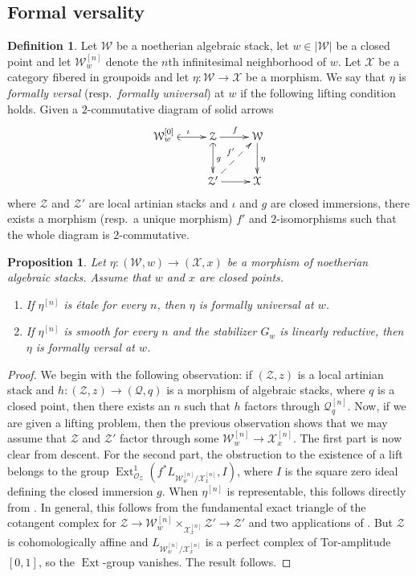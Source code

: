 \documentclass[a4paper]{amsart}
\theoremstyle{plain}
\newtheorem{proposition}[theorem]{Proposition}
\theoremstyle{definition}
\newtheorem{definition}[theorem]{Definition}
\theoremstyle{remark}
\numberwithin{equation}{section}
\newcommand{\stX}{\mathcal{X}} %
\newcommand{\stZ}{\mathcal{Z}} %
\newcommand{\stW}{\mathcal{W}} %
\newcommand\cW{\mathcal{W}}
\newcommand\cX{\mathcal{X}}
\newcommand\cZ{\mathcal{Z}}
\newcommand\oh{\mathcal{O}}
\DeclareMathOperator{\Ext}{Ext}
\begin{document}

\subsection{Formal versality}

\begin{definition}
Let $\stW$ be a noetherian algebraic stack, let $w\in |\stW|$ be a closed point and let
$\stW_w^{[n]}$ denote the $n$th infinitesimal neighborhood of $w$. Let $\stX$ be
a category fibered in groupoids and let $\eta\colon \stW\to \stX$ be a
morphism. We say that $\eta$ is \emph{formally versal} (resp.\ \emph{formally
  universal}) at $w$ if the following lifting condition holds. Given a
$2$-commutative diagram of solid arrows
\[
\xymatrix{
\stW_w^{[0]}\ar@{(->}[r]^{\iota}
  & \stZ\ar[r]^{f}\ar@{(->}[d]^{g}
  & \stW\ar[d]^{\eta} \\
& \stZ'\ar[r]\ar@{-->}[ur]^{f\mathrlap{'}} & \stX
}
\]
where $\stZ$ and $\stZ'$ are local artinian stacks and $\iota$ and $g$ are
closed immersions, there exists a morphism (resp.\ a unique morphism) $f'$
and $2$-isomorphisms such that the whole diagram is $2$-commutative.
\end{definition}

\begin{proposition}\label{P:formal-versality-criterion}
Let $\eta\colon (\stW,w)\to (\stX,x)$ be a morphism of noetherian algebraic
stacks.  Assume that $w$ and $x$ are closed points.
\begin{enumerate}
\item If $\eta^{[n]}$ is \'etale for every $n$, then
$\eta$ is formally universal at $w$.
\item If $\eta^{[n]}$ is smooth for every $n$ and the stabilizer $G_w$ is
linearly reductive, then $\eta$ is formally versal at $w$.
\end{enumerate}
\end{proposition}
\begin{proof}
We begin with the following observation: if $(\cZ,z)$ is a local artinian stack
and $h\colon (\cZ,z) \to (\mathcal{Q},q)$ is a morphism of algebraic stacks,
where $q$ is a closed point, then there exists an $n$ such that $h$ factors
through $\mathcal{Q}_q^{[n]}$.  Now, if we are given a lifting problem, then
the previous observation shows that we may assume that $\cZ$ and $\cZ'$ factor
through some $\cW_w^{[n]} \to \cX_x^{[n]}$.
The first part is now clear from descent.
For the second part, the obstruction to the existence of a lift belongs to the group $\Ext^1_{\oh_{\cZ}}(f^*L_{\cW_w^{[n]}/\cX_x^{[n]}},I)$, where $I$ is the square zero ideal defining the closed immersion $g$. When $\eta^{[n]}$
is representable, this follows directly from \cite[Thm.~1.5]{olsson-defn}. In
general, this follows from the fundamental exact triangle of the cotangent
complex for $\cZ\to \cW_w^{[n]}\times_{\cX_x^{[n]}} \cZ'\to \cZ'$ and two
applications of \cite[Thm.~1.1]{olsson-defn}.
But $\cZ$ is cohomologically affine and $L_{\cW_w^{[n]}/\cX_x^{[n]}}$ is a
perfect complex of Tor-amplitude $[0,1]$, so the $\Ext$-group vanishes. The
result follows.
\end{proof}
\end{document}
